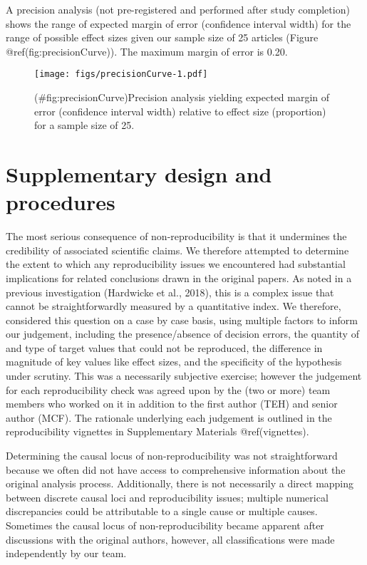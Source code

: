\begin{appendix}
A precision analysis (not pre-registered and performed after study
completion) shows the range of expected margin of error (confidence
interval width) for the range of possible effect sizes given our sample
size of 25 articles (Figure @ref(fig:precisionCurve)). The maximum
margin of error is 0.20.

\begin{figure}
\centering
\texttt{[image: figs/precisionCurve-1.pdf]}
\caption{(\#fig:precisionCurve)Precision analysis yielding expected
margin of error (confidence interval width) relative to effect size
(proportion) for a sample size of 25.}
\end{figure}

\hypertarget{sup_design}{%
\section{Supplementary design and procedures}\label{sup_design}}

The most serious consequence of non-reproducibility is that it
undermines the credibility of associated scientific claims. We therefore
attempted to determine the extent to which any reproducibility issues we
encountered had substantial implications for related conclusions drawn
in the original papers. As noted in a previous investigation (Hardwicke
et al., 2018), this is a complex issue that cannot be straightforwardly
measured by a quantitative index. We therefore, considered this question
on a case by case basis, using multiple factors to inform our judgement,
including the presence/absence of decision errors, the quantity of and
type of target values that could not be reproduced, the difference in
magnitude of key values like effect sizes, and the specificity of the
hypothesis under scrutiny. This was a necessarily subjective exercise;
however the judgement for each reproducibility check was agreed upon by
the (two or more) team members who worked on it in addition to the first
author (TEH) and senior author (MCF). The rationale underlying each
judgement is outlined in the reproducibility vignettes in Supplementary
Materials @ref(vignettes).

Determining the causal locus of non-reproducibility was not
straightforward because we often did not have access to comprehensive
information about the original analysis process. Additionally, there is
not necessarily a direct mapping between discrete causal loci and
reproducibility issues; multiple numerical discrepancies could be
attributable to a single cause or multiple causes. Sometimes the causal
locus of non-reproducibility became apparent after discussions with the
original authors, however, all classifications were made independently
by our team.


\end{appendix}
